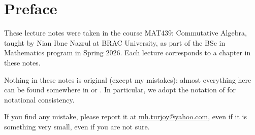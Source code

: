 \section*{Preface}
These lecture notes were taken in the course MAT439: Commutative Algebra, taught by Nian Ibne Nazrul at BRAC University, as part of the BSc in Mathematics program in Spring 2026. Each lecture corresponds to a chapter in these notes.

Nothing in these notes is original (except my mistakes); almost everything here can be found somewhere in \cite{AtiyahMacdonald} or \cite{Eisenbud}. In particular, we adopt the notation of \cite{AtiyahMacdonald} for notational consistency.

If you find any mistake, please report it at \href{mailto:your.email@example.com}{mh.turjoy@yahoo.com}, even if it is something very small, even if you are not sure.
